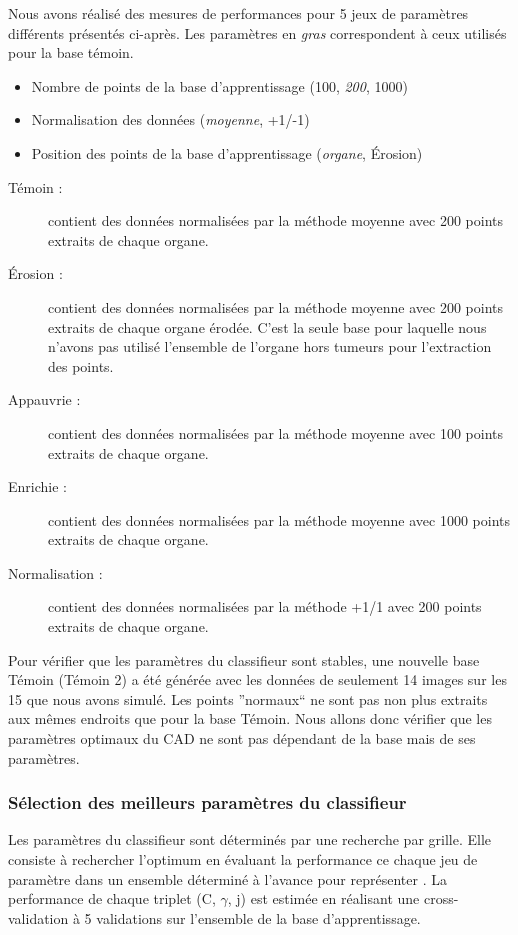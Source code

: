 Nous avons réalisé des mesures de performances pour 5 jeux de paramètres différents présentés ci-après. Les paramètres en \emph{gras} correspondent à ceux utilisés pour la base témoin.


\begin{itemize}
 \item Nombre de points de la base d'apprentissage (100, \emph{200}, 1000)
 \item Normalisation des données (\emph{moyenne}, +1/-1)
 \item Position des points de la base d'apprentissage (\emph{organe}, Érosion)
\end{itemize}


\begin{description}
 \item[Témoin : ] contient des données normalisées par la méthode moyenne avec 200 points extraits de chaque organe.
 \item[\'Erosion : ] contient des données normalisées par la méthode moyenne avec 200 points extraits de chaque organe érodée. C'est la seule base pour laquelle nous n'avons pas utilisé l'ensemble de l'organe hors tumeurs pour l'extraction des points.
 \item[Appauvrie : ] contient des données normalisées par la méthode moyenne avec 100 points extraits de chaque organe.
 \item[Enrichie : ] contient des données normalisées par la méthode moyenne avec 1000 points extraits de chaque organe.
 \item[Normalisation : ] contient des données normalisées par la méthode +1/1 avec 200 points extraits de chaque organe.
\end{description}

Pour vérifier que les paramètres du classifieur sont stables, une nouvelle base Témoin (Témoin 2) a été générée avec les données de seulement 14 images sur les 15 que nous avons simulé. Les points ''normaux`` ne sont pas non plus extraits aux mêmes endroits que pour la base Témoin. Nous allons donc vérifier que les paramètres optimaux du CAD ne sont pas dépendant de la base mais de ses paramètres.


\subsubsection{Sélection des meilleurs paramètres du classifieur}

Les paramètres du classifieur sont déterminés par une recherche par grille. Elle consiste à rechercher l'optimum en évaluant la performance ce chaque jeu de paramètre dans un ensemble déterminé à l'avance pour représenter . La performance de chaque triplet (C, $\gamma$, j) est estimée en réalisant une cross-validation à 5 validations sur l'ensemble de la base d'apprentissage.


